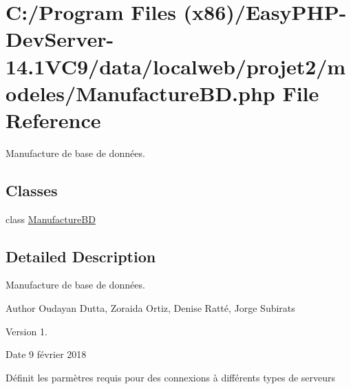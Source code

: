 \hypertarget{_manufacture_b_d_8php}{}\section{C\+:/\+Program Files (x86)/\+Easy\+P\+H\+P-\/\+Dev\+Server-\/14.1\+V\+C9/data/localweb/projet2/modeles/\+Manufacture\+BD.php File Reference}
\label{_manufacture_b_d_8php}


Manufacture de base de données.  


\subsection*{Classes}
\begin{DoxyCompactItemize}
\item 
class \hyperlink{class_manufacture_b_d}{Manufacture\+BD}
\end{DoxyCompactItemize}


\subsection{Detailed Description}
Manufacture de base de données. 

\begin{DoxyAuthor}{Author}
Oudayan Dutta, Zoraida Ortiz, Denise Ratté, Jorge Subirats 
\end{DoxyAuthor}
\begin{DoxyVersion}{Version}
1. 
\end{DoxyVersion}
\begin{DoxyDate}{Date}
9 février 2018
\end{DoxyDate}
Définit les parmètres requis pour des connexions à différents types de serveurs 